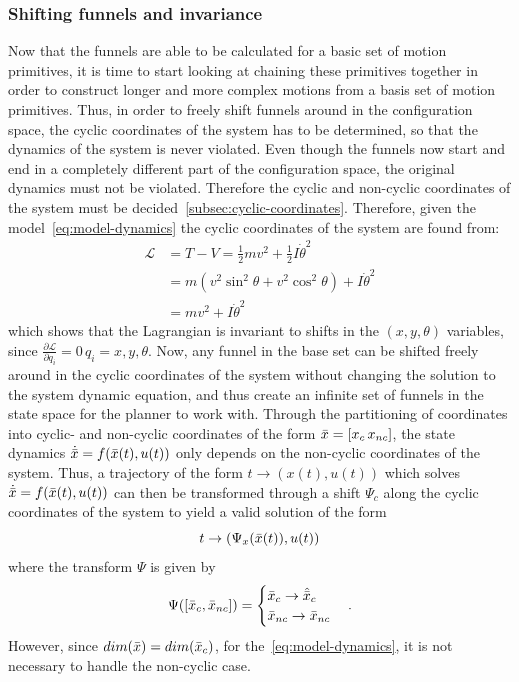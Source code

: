 \subsubsection{Shifting funnels and invariance}
\label{subsec:shifting-funnels}

Now that the funnels are able to be calculated for a basic set of motion
primitives, it is time to start looking at chaining these primitives together in
order to construct longer and more complex motions from a basis set of motion
primitives. Thus, in order to freely shift funnels around in the configuration
space, the cyclic coordinates of the system has to be determined, so that the
dynamics of the system is never violated. Even though the funnels now start and
end in a completely different part of the configuration space, the original
dynamics must not be violated. Therefore the cyclic and non-cyclic coordinates
of the system must be decided~\cref{subsec:cyclic-coordinates}. Therefore, given
the model~\cref{eq:model-dynamics} the cyclic coordinates of the system are
found from:
\begin{align*}
  \mathcal{L} &= T - V = \frac{1}{2} mv^2 + \frac{1}{2}I\dot{\theta}^2 \\ 
              &= m \left(
                v^2 \sin^2 \theta + v^2 \cos^2 \theta
                \right)  + I {\dot{\theta}}^2 \\
              &= mv^2 + I {\dot{\theta}}^2
\end{align*}
which shows that the Lagrangian is invariant to shifts in the \((x,y,\theta)\)
variables, since \(\frac{\partial\mathcal{L}}{\partial q_i} = 0 \, q_i =
x,y,\theta\). Now, any funnel in the base set can be shifted freely around in
the cyclic coordinates of the system without changing the solution to the system
dynamic equation, and thus create an infinite set of funnels in the state space
for the planner to work with. Through the partitioning of coordinates into
cyclic- and non-cyclic coordinates of the form \(\bar{x} = [x_c\, x_{nc}]\), the
state dynamics \(\dot{\bar{x}} = f(\bar{x} (t), u(t))\) only depends on the non-cyclic
coordinates of the system. Thus, a trajectory of the form \(t \rightarrow
(x(t),u(t))\) which solves \(\dot{\bar{x}} = f(\bar{x}(t),u(t))\) can then be transformed
through a shift \(\Psi_c\) along the cyclic coordinates of the system to yield a
valid solution of the form
\[
  t \rightarrow (\Psi_{x}(\bar{x}(t)), u(t))
\]
where the transform \(\Psi\) is given by
\[
  \Psi([\bar{x}_c, \bar{x}_{nc}]) =
  \begin{cases}
    \bar{x}_c \rightarrow \hat{\bar{x}}_{c} \\
    \bar{x}_{nc} \rightarrow \bar{x}_{nc} \\
  \end{cases}.
\]
However, since \(\mathnormal{dim}(\bar{x}) = \mathnormal{dim}(\bar{x}_c) \), for
the~\cref{eq:model-dynamics}, it is not necessary to handle the non-cyclic case.

